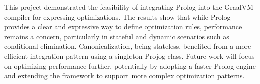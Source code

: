This project demonstrated the feasibility of integrating Prolog into the GraalVM compiler for expressing optimizations. The results show that while Prolog provides a clear and expressive way to define optimization rules, performance remains a concern, particularly in stateful and dynamic scenarios such as conditional elimination. Canonicalization, being stateless, benefited from a more efficient integration pattern using a singleton Projog class. Future work will focus on optimizing performance further, potentially by adopting a faster Prolog engine and extending the framework to support more complex optimization patterns.